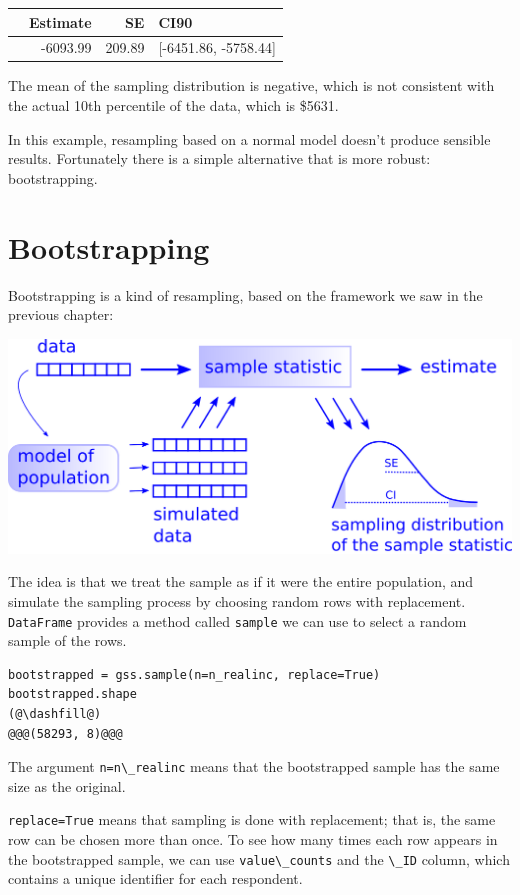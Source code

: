 \begin{tabular}{lrrl}
\midrule
{} &  Estimate &      SE &                  CI90 \\
\midrule
{} &  -6093.99 &  209.89 &  [-6451.86, -5758.44] \\
\midrule
\end{tabular}

The mean of the sampling distribution is negative, which is not
consistent with the actual 10th percentile of the data, which is \$5631.

In this example, resampling based on a normal model doesn't produce
sensible results. Fortunately there is a simple alternative that is more
robust: bootstrapping.

\hypertarget{bootstrapping}{%
\section{Bootstrapping}\label{bootstrapping}}

Bootstrapping is a kind of resampling, based on the framework we saw in
the previous chapter:

\includegraphics{figs/resampling.png}

The idea is that we treat the sample as if it were the entire
population, and simulate the sampling process by choosing random rows
with replacement. \passthrough{\lstinline!DataFrame!} provides a method
called \passthrough{\lstinline!sample!} we can use to select a random
sample of the rows.

\begin{lstlisting}[]
bootstrapped = gss.sample(n=n_realinc, replace=True)
bootstrapped.shape
(@\dashfill@)
@@@(58293, 8)@@@
\end{lstlisting}

The argument \passthrough{\lstinline!n=n\_realinc!} means that the
bootstrapped sample has the same size as the original.

\passthrough{\lstinline!replace=True!} means that sampling is done with
replacement; that is, the same row can be chosen more than once. To see
how many times each row appears in the bootstrapped sample, we can use
\passthrough{\lstinline!value\_counts!} and the
\passthrough{\lstinline!\_ID!} column, which contains a unique
identifier for each respondent.

